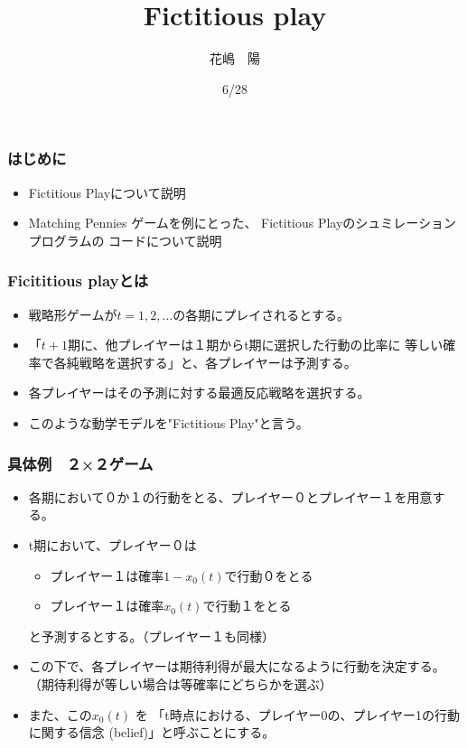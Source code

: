 \documentclass[dvipdfmx,fleqn,handout]{beamer}
\title{\Large Fictitious play}
\author{\large 花嶋　陽}
\date{\small 6/28}
\begin{document}
\sffamily
\gtfamily


\begin{frame}
  \titlepage
  \thispagestyle{empty}
\end{frame}

\setcounter{framenumber}{0}




\begin{frame}
\frametitle{はじめに}
\begin{itemize}\setlength{\parskip}{0.5em}
\item
Fictitious Playについて説明

\item
Matching Pennies ゲームを例にとった、
Fictitious Playのシュミレーションプログラムの
コードについて説明

\end{itemize}
\end{frame}



\begin{frame}
\frametitle{Ficititious playとは}
\begin{itemize}\setlength{\parskip}{0.5em}
\item
戦略形ゲームが$t=1,2,...$の各期にプレイされるとする。

\item
「$t+1$期に、他プレイヤーは１期からt期に選択した行動の比率に
等しい確率で各純戦略を選択する」と、各プレイヤーは予測する。 \pause


\item
各プレイヤーはその予測に対する最適反応戦略を選択する。 \pause

\item
このような動学モデルを"Fictitious Play"と言う。

\end{itemize}
\end{frame}

\begin{frame}
\frametitle{具体例　２×２ゲーム}
\begin{itemize}\setlength{\parskip}{0.5em}
\item
各期において０か１の行動をとる、プレイヤー０とプレイヤー１を用意する。

\item
t期において、プレイヤー０は
 \begin{itemize}\setlength{\parskip}{0.5em}
 \item
 プレイヤー１は確率$1-x_0(t)$で行動０をとる
 \item
 プレイヤー１は確率$x_0(t)$で行動１をとる
 \end{itemize}
と予測するとする。（プレイヤー１も同様）

\item
この下で、各プレイヤーは期待利得が最大になるように行動を決定する。（期待利得が等しい場合は等確率にどちらかを選ぶ）

\item
また、この$x_0(t)$ を
「t時点における、プレイヤー0の、プレイヤー1の行動に関する信念 (belief)」と呼ぶことにする。

\end{itemize}
\end{frame}
\end{document}

